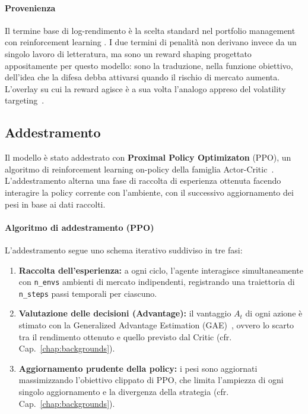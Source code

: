\paragraph{Provenienza}
Il termine base di log-rendimento è la scelta standard nel portfolio management
con reinforcement learning . I due termini di penalità non derivano invece
da un singolo lavoro di letteratura, ma sono un reward shaping progettato
appositamente per questo modello: sono la traduzione, nella funzione obiettivo,
dell'idea che la difesa debba attivarsi quando il rischio di mercato aumenta.
L'overlay su cui la reward agisce è a sua volta l'analogo appreso del volatility
targeting~\cite{moreira2017volatility}.

\subsection{Addestramento}
Il modello è stato addestrato con \textbf{Proximal Policy Optimizaton} (PPO), un algoritmo di reinforcement learning on-policy della famiglia Actor-Critic~\cite{schulman2017proximal}. L'addestramento alterna una fase di raccolta di esperienza ottenuta facendo interagire la policy corrente con l'ambiente, con il successivo aggiornamento dei pesi in base ai dati raccolti.

\paragraph{Algoritmo di addestramento (PPO)}
L'addestramento segue uno schema iterativo suddiviso in tre fasi:
\begin{enumerate}
    \item \textbf{Raccolta dell'esperienza:} a ogni ciclo, l'agente interagisce simultaneamente con \lstinline{n_envs} ambienti di mercato indipendenti, registrando una traiettoria di \lstinline{n_steps} passi temporali per ciascuno.

    \item \textbf{Valutazione delle decisioni (Advantage):} il vantaggio $A_t$ di ogni azione è stimato con la Generalized Advantage Estimation (GAE)~\cite{schulman2016gae}, ovvero lo scarto tra il rendimento ottenuto e quello previsto dal Critic (cfr. Cap.~\ref{chap:backgrounds}).

    \item \textbf{Aggiornamento prudente della policy:} i pesi sono aggiornati massimizzando l'obiettivo clippato di PPO, che limita l'ampiezza di ogni singolo aggiornamento e la divergenza della strategia (cfr. Cap.~\ref{chap:backgrounds}).
\end{enumerate}

